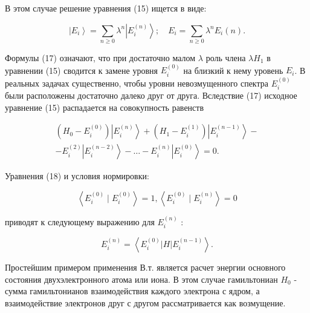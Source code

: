 \documentclass[10pt]{article}
\begin{document}
В этом случае решение уравнения (15) ищется в виде:



\[

\left|E_{i}\right\rangle=\sum_{n \geqslant 0} \lambda^{n}\left|E_{i}^{(n)}\right\rangle ; \quad E_{i}=\sum_{n \geqslant 0} \lambda^{n} E_{i}(n) .

\]



Формулы (17) означают, что при достаточно малом $\lambda$ роль члена $\lambda H_{1}$ в уравнении (15) сводится к замене уровня $E_{i}^{(0)}$ на близкий к нему уровень $E_{i}$. В реальных задачах существенно, чтобы уровни невозмущенного спектра $E_{i}^{(0)}$ были расположены достаточно далеко друг от друга. Вследствие (17) исходное уравнение (15) распадается на совокупность равенств



\[

\begin{gathered}

\left(H_{0}-E_{i}^{(0)}\right)\left|E_{i}^{(n)}\right\rangle+\left(H_{1}-E_{i}^{(1)}\right)\left|E_{i}^{(n-1)}\right\rangle- \\

-E_{i}^{(2)}\left|E_{i}^{(n-2)}\right\rangle-\ldots-E_{i}^{(n)}\left|E_{i}^{(0)}\right\rangle=0 .

\end{gathered}

\]



Уравнения (18) и условия нормировки:



\[

\left\langle E_{i}^{(0)} \mid E_{i}^{(0)}\right\rangle=1,\left\langle E_{i}^{(0)} \mid E_{i}^{(n)}\right\rangle=0

\]



приводят к следующему выражению для $E_{i}^{(n)}$ :



\[

E_{i}^{(n)}=\left\langle E_{i}^{(0)}|H| E_{i}^{(n-1)}\right\rangle .

\]



Простейшим примером применения В.т. является расчет энергии основного состояния двухэлектронного атома или иона. В этом случае гамильтониан $H_{0}$ - сумма гамильтонианов взаимодействия каждого электрона с ядром, а взаимодействие электронов друг с другом рассматривается как возмущение.
\end{document}
